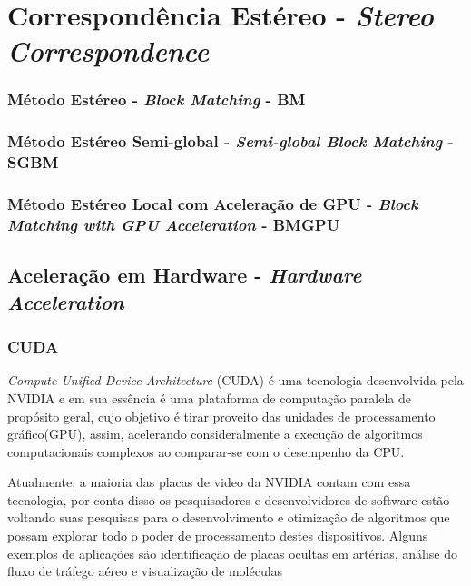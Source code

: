 \section{Correspondência Estéreo - \textit{Stereo Correspondence}}

\subsubsection{Método Estéreo - \textit{Block Matching} - BM}

\subsubsection{Método Estéreo Semi-global - \textit{Semi-global Block Matching} - SGBM}

\subsubsection{Método Estéreo Local com Aceleração de GPU - \textit{Block Matching with GPU Acceleration} - BMGPU}

\subsection{Aceleração em Hardware - \textit{Hardware Acceleration}}
\subsubsection{CUDA}

\textit{Compute Unified Device Architecture} (CUDA) é uma tecnologia desenvolvida pela NVIDIA e em sua essência é uma plataforma de computação paralela de propósito geral, cujo objetivo é tirar proveito das unidades de processamento gráfico(GPU), assim, acelerando consideralmente a execução de algoritmos computacionais complexos ao comparar-se com o desempenho da CPU.

Atualmente, a maioria das placas de video da NVIDIA contam com essa tecnologia, por conta disso os pesquisadores e desenvolvidores de software estão voltando suas pesquisas para o desenvolvimento e otimização de algoritmos que possam explorar todo o poder de processamento destes dispositivos. Alguns exemplos de aplicações são identificação de placas ocultas em artérias, análise do fluxo de tráfego aéreo e visualização de moléculas

